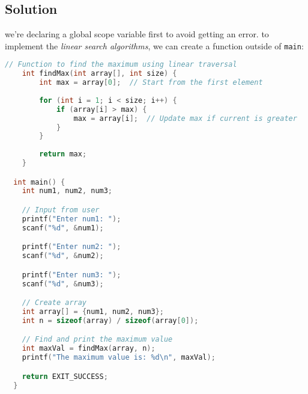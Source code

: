 \documentclass{article}
\begin{document}
  \begin{center}
  \end{center}

  \vfill\null

  \subsection{Solution}

  we're declaring a global scope variable first to avoid getting an error.
  to implement the \textit{linear search algorithms}, we can create a function outside of \texttt{main}:

  \begin{lstlisting}[language=C, caption=findMax function]
    // Function to find the maximum using linear traversal
    int findMax(int array[], int size) {
        int max = array[0];  // Start from the first element
    
        for (int i = 1; i < size; i++) {
            if (array[i] > max) {
                max = array[i];  // Update max if current is greater
            }
        }
    
        return max;
    }

  int main() {
    int num1, num2, num3;

    // Input from user
    printf("Enter num1: ");
    scanf("%d", &num1);

    printf("Enter num2: ");
    scanf("%d", &num2);

    printf("Enter num3: ");
    scanf("%d", &num3);

    // Create array
    int array[] = {num1, num2, num3};
    int n = sizeof(array) / sizeof(array[0]);

    // Find and print the maximum value
    int maxVal = findMax(array, n);
    printf("The maximum value is: %d\n", maxVal);

    return EXIT_SUCCESS;
  }
 
  \end{lstlisting}
\end{document}
